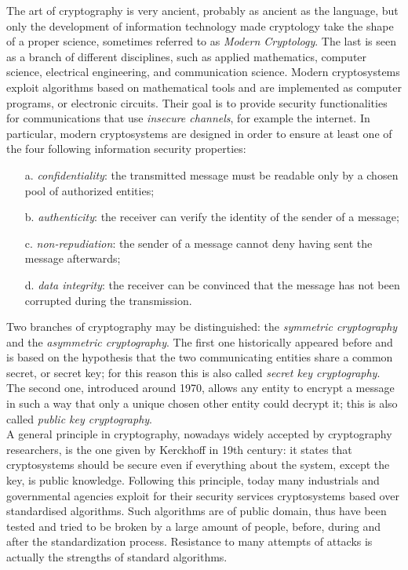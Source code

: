 The art of cryptography is very ancient, probably as ancient as the language, but only the development of information technology made cryptology take the shape of a proper science, sometimes referred to as \emph{Modern Cryptology}. The last is seen as a branch of different disciplines, such as applied mathematics, computer science, electrical engineering, and communication science. Modern cryptosystems exploit algorithms based on mathematical tools and are implemented as computer programs, or electronic circuits. Their goal is to provide security functionalities for communications that use \emph{insecure channels}, for example the internet. In particular, modern cryptosystems are designed in order to ensure at least one of the four following information security properties:
\begin{itemize}
\item[a.] \emph{confidentiality}: the transmitted message must be readable only by a chosen pool of authorized entities;
\item[b.] \emph{authenticity}: the receiver can verify the identity of the sender of a message;
\item[c.] \emph{non-repudiation}: the sender of a message cannot deny having sent the message afterwards;
\item[d.] \emph{data integrity}: the receiver can be convinced that the message has not been corrupted during the transmission.


\end{itemize} 

Two branches of cryptography may be distinguished: the \emph{symmetric cryptography} and the \emph{asymmetric cryptography}. The first one historically appeared before and is based on the hypothesis that the two communicating entities share a common secret, or secret key; for this reason this is also called \emph{secret key cryptography}. The second one, introduced around 1970, allows any entity to encrypt a message in such a way that only a unique chosen other entity could decrypt it; this is also called \emph{public key cryptography}. \\

A general principle in cryptography, nowadays widely accepted by cryptography researchers, is the one given by Kerckhoff in 19th century: it states that cryptosystems should be secure even if everything about the system, except the key, is public knowledge. Following this principle, today many industrials and governmental agencies exploit for their security services cryptosystems based over standardised algorithms. Such algorithms are of public domain, thus have been tested and tried to be broken by a large amount of people, before, during and after the standardization process. Resistance to many attempts of attacks is actually the strengths of standard algorithms. \\

